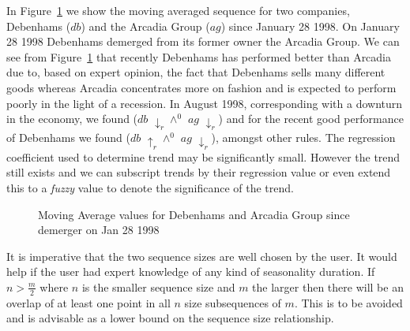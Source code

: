 \medskip

In Figure~\ref{graph:deb_199_2} we show the moving averaged sequence
for two companies, Debenhams ($db$) and the Arcadia Group ($ag$) since
January 28 1998. On January 28 1998 Debenhams demerged from its former
owner the
Arcadia Group. We can see from Figure~\ref{graph:deb_199_2} that
recently Debenhams has performed better 
than Arcadia due to, based on expert opinion, the fact that Debenhams
sells many different goods whereas Arcadia concentrates more on fashion and
is expected to perform poorly in the light of a recession. In August
1998, corresponding with a downturn in the economy, we found
  ($db$ $\downarrow_r \wedge^0$ $ag$ $\downarrow_r$) and
for the recent good performance of Debenhams we found  ($db$
$\uparrow_r \wedge^0$ $ag$ $\downarrow_r$), amongst other rules. The
regression coefficient used to determine trend may be significantly
small. However the trend still exists and we can subscript trends by
their regression value or even extend this to a {\em fuzzy} value to denote the
significance of the trend.   


\begin{figure}
\centerline{}
\caption{\label{graph:deb_199_2}{Moving Average values for
Debenhams and Arcadia Group since demerger on Jan 28 1998}}
\end{figure}


It is imperative that the two sequence sizes are well chosen by the
user. It would help if the user had expert knowledge of any kind of
seasonality duration. If $n > \frac{m}{2}$ where $n$ is the
smaller sequence size and $m$ the larger then there will be an overlap
of at least one point in all $n$ size subsequences of $m$. This is to
be avoided and is advisable as a lower bound on the sequence size
relationship. 

